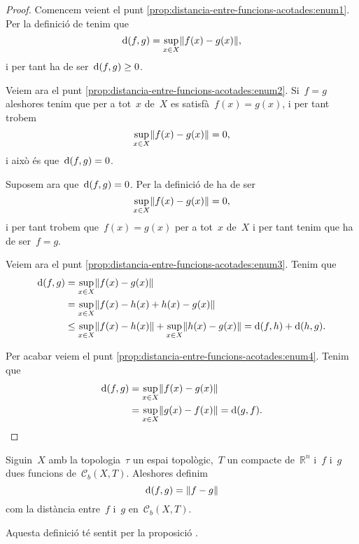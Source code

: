 \documentclass[../../main.tex]{subfiles}
\begin{document}
    \begin{proof}
        Comencem veient el punt \eqref{prop:distancia-entre-funcions-acotades:enum1}.
        Per la definició de  tenim que
        \[
            \distancia(f,g)=\sup_{x\in X}\norm{f(x)-g(x)},
        \]
        i per tant ha de ser~\(\operatorname{d}(f,g)\geq0\).

        Veiem ara el punt \eqref{prop:distancia-entre-funcions-acotades:enum2}.
        Si~\(f=g\) aleshores tenim que per a tot~\(x\) de~\(X\) es satisfà~\(f(x)=g(x)\), i per tant trobem
        \[
            \sup_{x\in X}\norm{f(x)-g(x)}=0,
        \]
        i això és que~\(\operatorname{d}(f,g)=0\).

        Suposem ara que~\(\operatorname{d}(f,g)=0\).
        Per la definició de  ha de ser
        \[
            \sup_{x\in X}\norm{f(x)-g(x)}=0,
        \]
        i per tant trobem que~\(f(x)=g(x)\) per a tot~\(x\) de~\(X\) i per tant tenim que ha de ser~\(f=g\).

        Veiem ara el punt \eqref{prop:distancia-entre-funcions-acotades:enum3}.
        Tenim que
        \begin{align*}
            \distancia(f,g)&=\sup_{x\in X}\norm{f(x)-g(x)} \\
            &=\sup_{x\in X}\norm{f(x)-h(x)+h(x)-g(x)} \\
            &\leq\sup_{x\in X}\norm{f(x)-h(x)}+\sup_{x\in X}\norm{h(x)-g(x)}=\distancia(f,h)+\distancia(h,g).
        \end{align*}

        Per acabar veiem el punt \eqref{prop:distancia-entre-funcions-acotades:enum4}.
        Tenim que
        \begin{align*}
            \distancia(f,g)&=\sup_{x\in X}\norm{f(x)-g(x)} \\
            &=\sup_{x\in X}\norm{g(x)-f(x)}=\distancia(g,f).\qedhere
        \end{align*}
    \end{proof}
    \begin{definition}
        \label{def:distancia-entre-funcions-acotades}
        Siguin~\(X\) amb la topologia~\(\tau\) un espai topològic,~\(T\) un compacte de~\(\mathbb{R}^{n}\) i~\(f\) i~\(g\) dues funcions de~\(\mathcal{C}_{b}(X,T)\).
        Aleshores definim
        \[
            \distancia(f,g)=\norm{f-g}
        \]
        com la distància entre~\(f\) i~\(g\) en~\(\mathcal{C}_{b}(X,T)\).

        Aquesta definició té sentit per la proposició .
    \end{definition}
\end{document}
